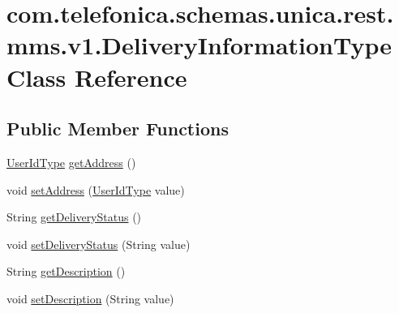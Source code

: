 \hypertarget{classcom_1_1telefonica_1_1schemas_1_1unica_1_1rest_1_1mms_1_1v1_1_1DeliveryInformationType}{
\section{com.telefonica.schemas.unica.rest.mms.v1.DeliveryInformationType Class Reference}
\label{classcom_1_1telefonica_1_1schemas_1_1unica_1_1rest_1_1mms_1_1v1_1_1DeliveryInformationType}
}
\subsection*{Public Member Functions}
\begin{DoxyCompactItemize}
\item 
\hyperlink{classcom_1_1telefonica_1_1schemas_1_1unica_1_1rest_1_1common_1_1v1_1_1UserIdType}{UserIdType} \hyperlink{classcom_1_1telefonica_1_1schemas_1_1unica_1_1rest_1_1mms_1_1v1_1_1DeliveryInformationType_a61ec6151ae7ef884101ff3be0ed49742}{getAddress} ()
\item 
void \hyperlink{classcom_1_1telefonica_1_1schemas_1_1unica_1_1rest_1_1mms_1_1v1_1_1DeliveryInformationType_a28d578669e6da21acaa61ebe492499a4}{setAddress} (\hyperlink{classcom_1_1telefonica_1_1schemas_1_1unica_1_1rest_1_1common_1_1v1_1_1UserIdType}{UserIdType} value)
\item 
String \hyperlink{classcom_1_1telefonica_1_1schemas_1_1unica_1_1rest_1_1mms_1_1v1_1_1DeliveryInformationType_a349c98421d85a7bf5b6eb8eb4404bb6c}{getDeliveryStatus} ()
\item 
void \hyperlink{classcom_1_1telefonica_1_1schemas_1_1unica_1_1rest_1_1mms_1_1v1_1_1DeliveryInformationType_a24f2e3c46f593ea350c3b30271403b48}{setDeliveryStatus} (String value)
\item 
String \hyperlink{classcom_1_1telefonica_1_1schemas_1_1unica_1_1rest_1_1mms_1_1v1_1_1DeliveryInformationType_ab942e690dbc385db6a2c0d8c81986a34}{getDescription} ()
\item 
void \hyperlink{classcom_1_1telefonica_1_1schemas_1_1unica_1_1rest_1_1mms_1_1v1_1_1DeliveryInformationType_a9d8c69236b35c0b173b4f2e07edf07c5}{setDescription} (String value)
\end{DoxyCompactItemize}
